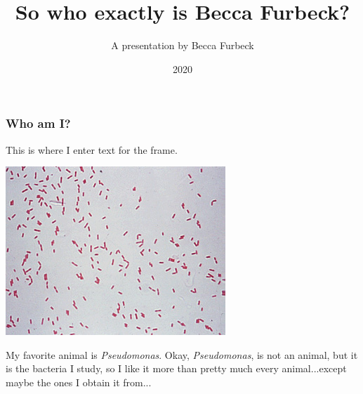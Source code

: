 \documentclass{beamer}
\title{So who exactly is Becca Furbeck?}
\author{A presentation by Becca Furbeck}
\institute{University of Nebraska-Lincoln}
\date{2020}
\begin{document}
\frame{\titlepage}
\begin{frame}
\frametitle{Who am I?}
This is where I enter text for the frame.
\end{frame}

\begin{frame}
\includegraphics{Pseudomonas}

My favorite animal is \emph{Pseudomonas}. Okay, \emph{Pseudomonas}, is not an animal, but it is the bacteria I study, so I like it more than pretty much every animal...except maybe the ones I obtain it from...
\end{frame}
\end{document}
